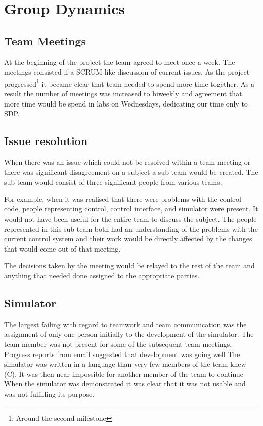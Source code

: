\section{Group Dynamics}

\subsection{Team Meetings}

At the beginning of the project the team agreed to meet once a week. The
meetings consisted if a SCRUM like discussion of current issues. As the
project progressed\footnote{Around the second milestone} it became clear that
team needed to spend more time together. As a result the number of
meetings was increased to biweekly and agreement that more time would be spend
in labs on Wednesdays, dedicating our time only to SDP.

\subsection{Issue resolution}

When there was an issue which could not be resolved within a team meeting or
there was significant disagreement on a subject a sub team would be created.
The sub team would consist of three significant people from various
teams.

For example, when it was realised that there were problems with the control
code, people representing control, control interface, and simulator were
present. It would not have been useful for the entire team to discuss the
subject. The people represented in this sub team both had an understanding of
the problems with the current control system and their work would be directly
affected by the changes that would come out of that meeting.

The decisions taken by the meeting would be relayed to the rest of the team and
anything that needed done assigned to the appropriate parties.

\subsection{Simulator}

The largest failing with regard to teamwork and team communication was the
assignment of only one person initially to the development of the simulator.
The team member was not present for some of the subsequent team meetings.
Progress reports from email suggested that development was going well The
simulator was written in a language than very few members of the team knew (C).
It was then near impossible for another member of the team to continue When the
simulator was demonstrated it was clear that it was not usable and was not
fulfilling its purpose.

